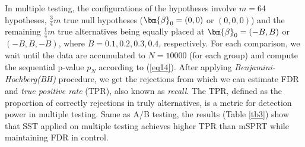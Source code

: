 \documentclass[letterpaper]{article} %
\newcommand{\V}[1]{{\bm{\mathbf{\MakeLowercase{#1}}}}} %
\begin{document}
In multiple testing, the configurations of the hypotheses involve $m=64$ hypotheses, $\frac{3}{4}m$ true null hypotheses ($\V{\beta}_0=(0,0)$ or $(0,0,0)$) and the remaining $\frac{1}{4}m$ true alternatives being equally placed at $\V{\beta}_0=(-B,B)$ or $(-B,B,-B)$, where $B=0.1,0.2,0.3,0.4$, respectively. For each comparison, we wait until the data are accumulated to $N=10000$ (for each group) and compute the sequential p-value $p_N$ according to (\ref{eq14}). After applying \textit{Benjamini-Hochberg(BH)} procedure, we get the rejections from which we can estimate FDR and \textit{true positive rate} (TPR), also known as \textit{recall}. The TPR, defined as the proportion of correctly rejections in truly alternatives, is a metric for detection power in multiple testing. Same as A/B testing, the results (Table \ref{tb3}) show that SST applied on multiple testing achieves higher TPR than mSPRT while maintaining FDR in control.
\end{document}
